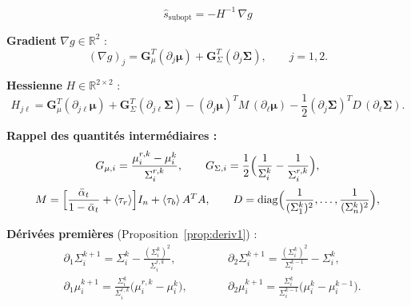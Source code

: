 \documentclass[12pt]{article}
\newcommand{\alt}{\bar\alpha_t}
\begin{document}
\begin{resultbox}
\label{res:sopt_final}
\begin{equation}
\boxed{
\hat{s}_{\mathrm{subopt}} = -H^{-1}\,\nabla g
}
\end{equation}

\medskip
\noindent\textbf{Gradient} $\nabla g \in \mathbb{R}^2$ :
\begin{equation}
(\nabla g)_j = \boldsymbol{G}_\mu^T(\partial_j\boldsymbol{\mu}) + \boldsymbol{G}_\Sigma^T(\partial_j\boldsymbol{\Sigma}), \qquad j = 1, 2.
\end{equation}

\noindent\textbf{Hessienne} $H \in \mathbb{R}^{2\times 2}$ :
\begin{equation}
H_{j\ell} = \boldsymbol{G}_\mu^T(\partial_{j\ell}\boldsymbol{\mu}) + \boldsymbol{G}_\Sigma^T(\partial_{j\ell}\boldsymbol{\Sigma}) - (\partial_j\boldsymbol{\mu})^T M\,(\partial_\ell\boldsymbol{\mu}) - \frac{1}{2}(\partial_j\boldsymbol{\Sigma})^T D\,(\partial_\ell\boldsymbol{\Sigma}).
\end{equation}

\noindent\textbf{Rappel des quantités intermédiaires :}
\begin{equation}
G_{\mu,i} = \frac{\mu_i^{r,k} - \mu_i^k}{\Sigma_i^{r,k}}, \qquad G_{\Sigma,i} = \frac{1}{2}\Bigl(\frac{1}{\Sigma_i^k} - \frac{1}{\Sigma_i^{r,k}}\Bigr),
\end{equation}
\begin{equation}
M = \Bigl[\frac{\alt}{1-\alt} + \langle\tau_r\rangle\Bigr]I_n + \langle\tau_b\rangle\,A^TA, \qquad D = \mathrm{diag}\Bigl(\frac{1}{(\Sigma_1^k)^2}, \ldots, \frac{1}{(\Sigma_n^k)^2}\Bigr),
\end{equation}

\noindent\textbf{Dérivées premières} (Proposition~\ref{prop:deriv1}) :
\begin{equation}
\begin{aligned}
&\partial_1 \Sigma_i^{k+1} = \Sigma_i^k - \frac{(\Sigma_i^k)^2}{\Sigma_i^{r,k}}, \qquad
&&\partial_2 \Sigma_i^{k+1} = \frac{(\Sigma_i^k)^2}{\Sigma_i^{k-1}} - \Sigma_i^k,\\[4pt]
&\partial_1 \mu_i^{k+1} = \frac{\Sigma_i^k}{\Sigma_i^{r,k}} \bigl( \mu_i^{r,k} - \mu_i^k \bigr), \qquad
&&\partial_2 \mu_i^{k+1} = \frac{\Sigma_i^k}{\Sigma_i^{k-1}} \bigl( \mu_i^k - \mu_i^{k-1} \bigr).
\end{aligned}
\end{equation}


\end{resultbox}
\end{document}
